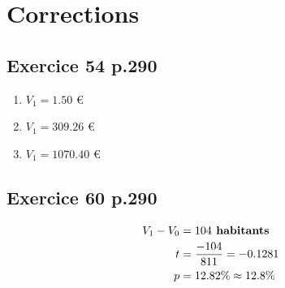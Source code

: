 \documentclass[10pt,a4paper,openany,twoside, prof]{book}
\begin{document}
\entetegal{}

\section*{Corrections}
\subsection*{Exercice 54 p.290}
\begin{enumerate}[label=\alph*]
  \item $V_1=1.50$ \euro
  \item $V_1=309.26$ \euro
  \item $V_1=1070.40$ \euro
\end{enumerate}

\subsection*{Exercice 60 p.290}
\begin{align*}
  V_1-V_0 &= 104 \text{\textbf{ habitants}} \\
  t &= \frac{-104}{811} = -0.1281 \\
  p &=12.82\% \approx 12.8\%
\end{align*}
\end{document}
